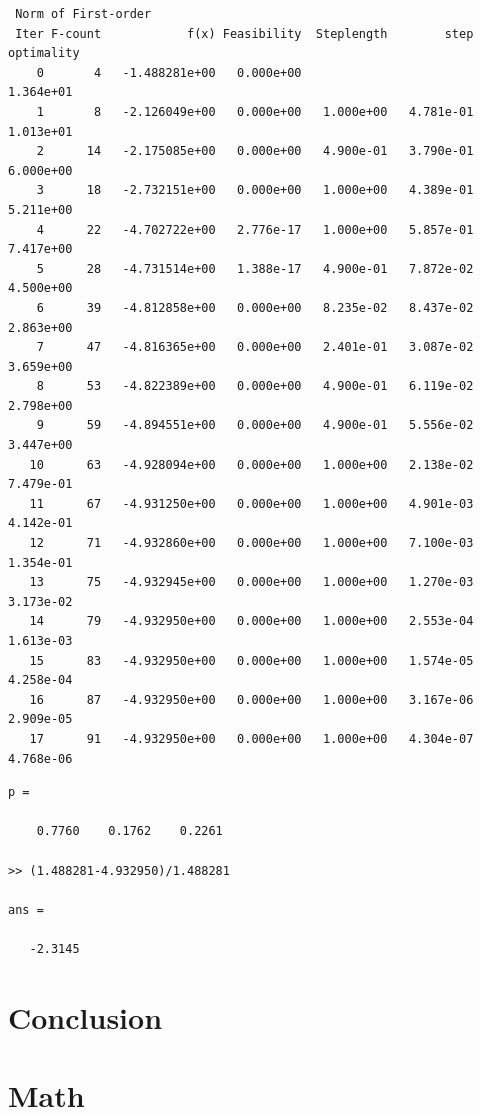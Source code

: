 \documentclass[11pt]{article}
\begin{document}
\begin{verbatim}
 Norm of First-order
 Iter F-count            f(x) Feasibility  Steplength        step  optimality
    0       4   -1.488281e+00   0.000e+00                           1.364e+01
    1       8   -2.126049e+00   0.000e+00   1.000e+00   4.781e-01   1.013e+01
    2      14   -2.175085e+00   0.000e+00   4.900e-01   3.790e-01   6.000e+00
    3      18   -2.732151e+00   0.000e+00   1.000e+00   4.389e-01   5.211e+00
    4      22   -4.702722e+00   2.776e-17   1.000e+00   5.857e-01   7.417e+00
    5      28   -4.731514e+00   1.388e-17   4.900e-01   7.872e-02   4.500e+00
    6      39   -4.812858e+00   0.000e+00   8.235e-02   8.437e-02   2.863e+00
    7      47   -4.816365e+00   0.000e+00   2.401e-01   3.087e-02   3.659e+00
    8      53   -4.822389e+00   0.000e+00   4.900e-01   6.119e-02   2.798e+00
    9      59   -4.894551e+00   0.000e+00   4.900e-01   5.556e-02   3.447e+00
   10      63   -4.928094e+00   0.000e+00   1.000e+00   2.138e-02   7.479e-01
   11      67   -4.931250e+00   0.000e+00   1.000e+00   4.901e-03   4.142e-01
   12      71   -4.932860e+00   0.000e+00   1.000e+00   7.100e-03   1.354e-01
   13      75   -4.932945e+00   0.000e+00   1.000e+00   1.270e-03   3.173e-02
   14      79   -4.932950e+00   0.000e+00   1.000e+00   2.553e-04   1.613e-03
   15      83   -4.932950e+00   0.000e+00   1.000e+00   1.574e-05   4.258e-04
   16      87   -4.932950e+00   0.000e+00   1.000e+00   3.167e-06   2.909e-05
   17      91   -4.932950e+00   0.000e+00   1.000e+00   4.304e-07   4.768e-06
\end{verbatim}

\begin{verbatim}
p =

    0.7760    0.1762    0.2261

>> (1.488281-4.932950)/1.488281

ans =

   -2.3145
\end{verbatim}

\section{Conclusion}

\section{Math}
\end{document}
